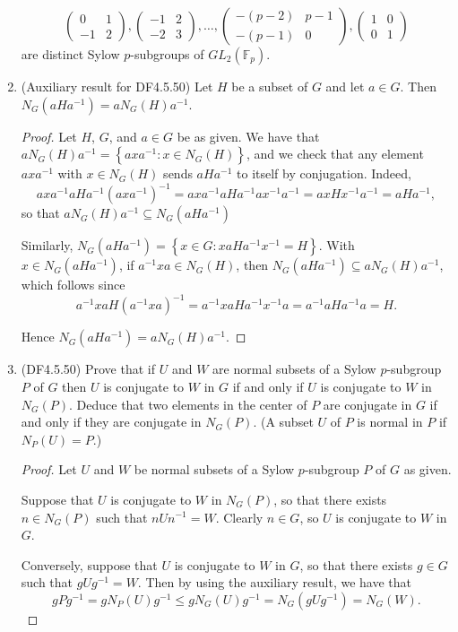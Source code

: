 \documentclass[11pt]{article}
\newcommand{\cbr}[1]{\left\{#1\right\}}
\begin{document}
\begin{enumerate}
\[{\begin{pmatrix}
      0 & 1 \\ -1 & 2
    \end{pmatrix}, \begin{pmatrix}
      -1 & 2 \\ -2 & 3
    \end{pmatrix}, \dots, \begin{pmatrix}
      -(p-2) & p-1 \\ -(p-1) & 0
    \end{pmatrix}, \begin{pmatrix}
      1 & 0 \\ 0 & 1
    \end{pmatrix}}\] are distinct Sylow $p$-subgroups of $GL_2(\mathbb{F}_p)$.
    \item (Auxiliary result for DF4.5.50) Let $H$ be a subset of $G$ and let $a\in G$. Then $N_G(aHa^{-1}) = aN_G(H)a^{-1}$.
    \begin{proof}
      Let $H$, $G$, and $a\in G$ be as given. We have that $aN_G(H)a^{-1} = \cbr{axa^{-1} \colon x\in N_G(H)}$, and we check that any element $axa^{-1}$ with $x\in N_G(H)$ sends $aHa^{-1}$ to itself by conjugation. Indeed, \[axa^{-1} aHa^{-1} (axa^{-1})^{-1} = axa^{-1} aHa^{-1} ax^{-1}a^{-1} = axH x^{-1}a^{-1}= aHa^{-1},\] so that $aN_G(H)a^{-1} \subseteq N_G(aHa^{-1})$

      Similarly, $N_G(aHa^{-1}) = \cbr{x\in G \colon xaHa^{-1}x^{-1} = H}$. With $x\in N_G(aHa^{-1})$, if $a^{-1}xa\in N_G(H)$, then $N_G(aHa^{-1}) \subseteq aN_G(H)a^{-1}$, which follows since \[a^{-1}xa H (a^{-1}xa)^{-1} = a^{-1}xa H a^{-1}x^{-1}a = a^{-1}a H a^{-1}a = H.\]

      Hence $N_G(aHa^{-1}) = aN_G(H)a^{-1}$.
    \end{proof}
    \item (DF4.5.50) Prove that if $U$ and $W$ are normal subsets of a Sylow $p$-subgroup $P$ of $G$ then $U$ is conjugate to $W$ in $G$ if and only if $U$ is conjugate to $W$ in $N_G(P)$. Deduce that two elements in the
    center of $P$ are conjugate in $G$ if and only if they are conjugate in $N_G(P)$. (A subset $U$ of
    $P$ is normal in $P$ if $N_P(U) = P$.)
    \begin{proof}
      Let $U$ and $W$ be normal subsets of a Sylow $p$-subgroup $P$ of $G$ as given. 

      Suppose that $U$ is conjugate to $W$ in $N_G(P)$, so that there exists $n\in N_G(P)$ such that $nUn^{-1} = W$. Clearly $n \in G$, so $U$ is conjugate to $W$ in $G$.

      Conversely, suppose that $U$ is conjugate to $W$ in $G$, so that there exists $g\in G$ such that $gUg^{-1} = W$. Then by using the auxiliary result, we have that \[gPg^{-1} = gN_P(U)g^{-1} \leq gN_G(U)g^{-1} = N_G(gUg^{-1}) = N_G(W).\]


\end{proof}
\end{enumerate}
\end{document}
